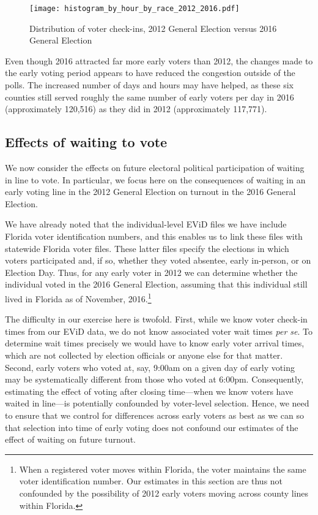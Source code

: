 \documentclass[12pt,titlepage]{article}
\begin{document}
\begin{figure}[!ht]
  \caption{Distribution of voter check-ins, 2012 General Election versus 2016 General Election}
  \label{fig:race2012and2016}
  \centering
  \centering\texttt{[image: histogram\_by\_hour\_by\_race\_2012\_2016.pdf]}
\end{figure}

Even though 2016 attracted far more early voters than 2012, the
changes made to the early voting period appears to have reduced the
congestion outside of the polls. The increased number of days and
hours may have helped, as these six counties still served roughly the
same number of early voters per day in 2016 (approximately 120,516) as
they did in 2012 (approximately 117,771). 



\subsection*{Effects of waiting to vote}

We now consider the effects on future electoral political
participation of waiting in line to vote.  In particular, we focus
here on the consequences of waiting in an early voting line in the
2012 General Election on turnout in the 2016 General Election.

We have already noted that the individual-level EViD files we have
include Florida voter identification numbers, and this enables us to
link these files with statewide Florida voter files.  These latter
files specify the elections in which voters participated and, if so,
whether they voted absentee, early in-person, or on Election Day.
Thus, for any early voter in 2012 we can determine whether the
individual voted in the 2016 General Election, assuming that this
individual still lived in Florida as of November, 2016.\footnote{When
  a registered voter moves within Florida, the voter maintains the
  same voter identification number.  Our estimates in this section are
  thus not confounded by the possibility of 2012 early voters moving
  across county lines within Florida.}

The difficulty in our exercise here is twofold.  First, while we know
voter check-in times from our EViD data, we do not know associated
voter wait times \emph{per se}.  To determine wait times precisely we
would have to know early voter arrival times, which are not collected
by election officials or anyone else for that matter.  Second, early
voters who voted at, say, 9:00am on a given day of early voting may be
systematically different from those who voted at 6:00pm. Consequently,
estimating the effect of voting after closing time---when we know
voters have waited in line---is potentially confounded by voter-level
selection.  Hence, we need to ensure that we control for differences
across early voters as best as we can so that selection into time of
early voting does not confound our estimates of the effect of waiting
on future turnout.
\end{document}
